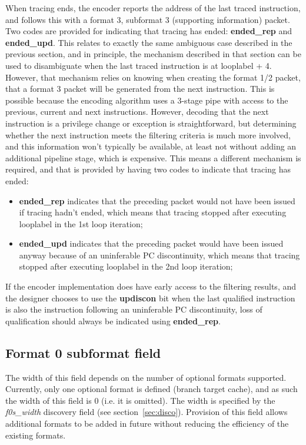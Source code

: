 When tracing ends, the encoder reports the address of the last traced instruction, and follows this with a format 3, 
subformat 3 (supporting information) packet.  Two codes are provided for indicating that tracing has ended: 
\textbf{ended\_rep} and \textbf{ended\_upd}.  This relates to exactly the same ambiguous case described in the previous
section, and in principle, the mechanism described in that section can be used to disambiguate when the last traced
instruction is at looplabel + 4.  However, that mechanism relies on knowing when creating the format 1/2 packet, that 
a format 3 packet will be generated from the next instruction.  This is possible because the encoding algorithm uses 
a 3-stage pipe with access to the previous, current and next instructions.  However, decoding that the next instruction
is a privilege change or exception is straightforward, but determining whether the next instruction meets the filtering
criteria is much more involved, and this information won't typically be available, at least not without adding an
additional pipeline stage, which is expensive.  This means a different mechanism is required, and that is provided
by having two codes to indicate that tracing has ended:

\begin{itemize}
  \item \textbf{ended\_rep} indicates that the preceding packet would not have been issued if tracing hadn't ended, 
    which means that tracing stopped after executing looplabel in the 1st loop iteration;
  \item \textbf{ended\_upd} indicates that the preceding packet would have been issued anyway because of an uninferable
    PC discontinuity, which means that tracing stopped after executing looplabel in the 2nd loop iteration;
\end{itemize}

If the encoder implementation does have early access to the filtering results, and the designer chooses to use the
\textbf{updiscon} bit when the last qualified instruction is also the instruction following an uninferable PC discontinuity,
loss of qualification should always be indicated using \textbf{ended\_rep}.

\subsection{Format 0 subformat field} \label{sec:f0s}

The width of this field depends on the number of optional formats supported.  Currently, only one optional format is
defined (branch target cache), and as such the width of this field is 0 (i.e. it is omitted).  The width is 
specified by the \textit{f0s\_width} discovery field (see section~\ref{sec:disco}).  Provision of this field
allows additional formats to be added in future without reducing the efficiency of the existing formats.

